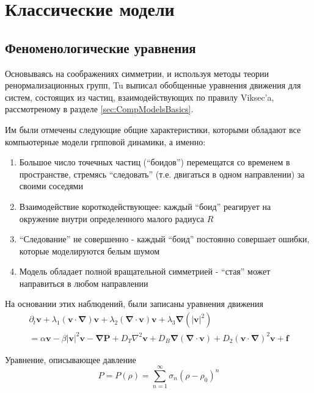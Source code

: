 \section{Классические модели} %
\label{sec:ClassicalModelsWIthViscosity}
	\subsection{Феноменологические уравнения} %
	\label{sub:TonerAndTu}
		Основываясь на соображениях симметрии, и используя методы теории ренормализационных групп, Tu \cite{tu2000} выписал обобщенные уравнения движения для систем, состоящих из частиц, взаимодействующих по правилу Viksec'a, рассмотреному в разделе \ref{sec:CompModelsBasics}. 

		Им были отмечены следующие общие характеристики, которыми обладают все компьютерные модели грпповой динамики, а именно:
		\begin{enumerate}
			\item Большое число точечных частиц (``боидов'') перемещатся со временем в пространстве, стремясь ``следовать'' (т.е. двигаться в одном направлении) за своими соседями
			\item Взаимодействие короткодействующее: каждый ``боид'' реагирует на окружение внутри определенного малого радиуса $R$
			\item ``Следование'' не совершенно - каждый ``боид'' постоянно совершает ошибки, которые моделируются белым шумом
			\item Модель обладает полной вращательной симметрией - ``стая'' может направиться в любом направлении
		\end{enumerate}

		На основании этих наблюдений, были записаны уравнения движения
		\begin{multline}
		\label{eq:TuEqOfMotion}
			\partial_t \boldsymbol{v} + \lambda_1(\boldsymbol{v} \cdot \boldsymbol{\nabla})\boldsymbol{v} + \lambda_2(\boldsymbol{\nabla} \cdot \boldsymbol{v})\boldsymbol{v} + \lambda_3\boldsymbol{\nabla}(|\boldsymbol{v}|^2) \\ = \alpha \boldsymbol{v} - \beta |\boldsymbol{v}|^2 \boldsymbol{v} - \boldsymbol{\nabla} \boldsymbol{P} + D_T \nabla^2 \boldsymbol{v} + D_B \boldsymbol{\nabla}(\boldsymbol{\nabla} \cdot \boldsymbol{v}) + D_2(\boldsymbol{v} \cdot \boldsymbol{\nabla})^2 \boldsymbol{v}+\boldsymbol{f}
		\end{multline}

		Уравнение, описывающее давление
		\begin{equation}
		\label{eq:TuEqOfPressure}
			P = P(\rho) = \sum_{n=1}^\infty \sigma_n(\rho - \rho_0)^n
		\end{equation}

